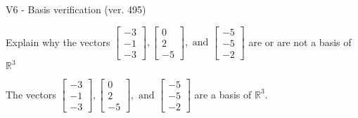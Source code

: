 \begin{exercise}
  \begin{exerciseTitle}V6 - Basis verification (ver. 495)\end{exerciseTitle}
  \begin{exerciseStatement}
    Explain why the vectors \(\left[\begin{array}{r}
-3 \\
-1 \\
-3
\end{array}\right] , \left[\begin{array}{r}
0 \\
2 \\
-5
\end{array}\right] , \text{ and } \left[\begin{array}{r}
-5 \\
-5 \\
-2
\end{array}\right]\) are or are not a basis of \(\mathbb{R}^3\)	


  \end{exerciseStatement}
  \begin{exerciseAnswer}
   The vectors \(\left[\begin{array}{r}
-3 \\
-1 \\
-3
\end{array}\right] , \left[\begin{array}{r}
0 \\
2 \\
-5
\end{array}\right] , \text{ and } \left[\begin{array}{r}
-5 \\
-5 \\
-2
\end{array}\right]\) 
  	 are  a basis of \(\mathbb{R}^3\).
  


  \end{exerciseAnswer}
\end{exercise}